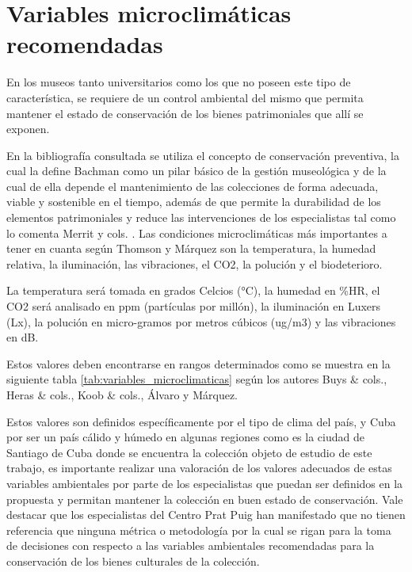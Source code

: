
    \section{Variables microclimáticas recomendadas}\label{sec:variables_microclimaticas}

    En los museos tanto universitarios como los que no poseen este tipo de característica, se requiere de un control ambiental del mismo que permita mantener el estado de conservación de los bienes patrimoniales que allí se exponen.

    En la bibliografía consultada se utiliza el concepto de conservación preventiva, la cual la define Bachman \cite{bachmann1992conservation} como un pilar básico de la gestión museológica y de la cual de ella depende el mantenimiento de las colecciones de forma adecuada, viable y sostenible en el tiempo, además de que permite la durabilidad de los elementos patrimoniales y reduce las intervenciones de los especialistas tal como lo comenta Merrit y cols. \cite{merrittPreventiveConservationHistoric2010}. Las condiciones microclimáticas más importantes a tener en cuanta según Thomson \cite{thomsonMuseumEnvironment2018} y Márquez \cite{marquezAgentesDeterioroMedioambientales2016} son la temperatura, la humedad relativa, la iluminación, las vibraciones, el CO2, la polución y el biodeterioro.

    La temperatura será tomada en grados Celcios (°C), la humedad en \%HR, el CO2 será analisado en ppm (partículas por millón), la iluminación en Luxers (Lx), la polución en micro-gramos por metros cúbicos (ug/m3) y las vibraciones en dB.

    Estos valores deben encontrarse en rangos determinados como se muestra en la siguiente tabla \ref{tab:variables_microclimaticas} según los autores Buys \& cols., Heras \& cols., Koob \& cols., Álvaro y Márquez.

    Estos valores son definidos específicamente por el tipo de clima del país, y Cuba por ser un país cálido y húmedo en algunas regiones como es la ciudad de Santiago de Cuba donde se encuentra la colección objeto de estudio de este trabajo,
    es importante realizar una valoración de los valores adecuados de estas variables ambientales por parte de los especialistas que puedan ser definidos en la propuesta y permitan mantener la colección en buen estado de conservación.
    Vale destacar que los especialistas del Centro Prat Puig han manifestado que no tienen referencia que ninguna métrica o metodología por la cual se rigan para la toma de decisiones con respecto a las variables ambientales recomendadas para la conservación de los bienes culturales de la colección.
    
